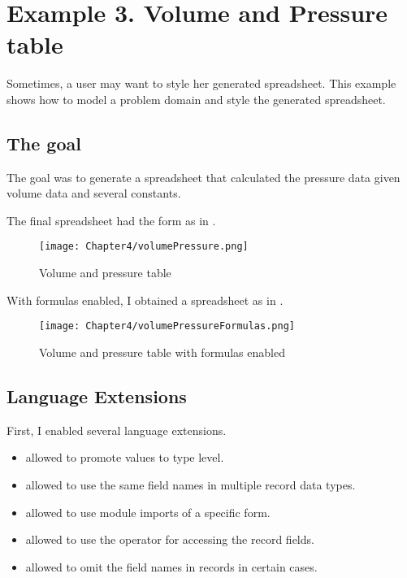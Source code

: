 \section{Example 3. Volume and Pressure table}

Sometimes, a user may want to style her generated spreadsheet.
This example shows how to model a problem domain and style the generated spreadsheet.

\subsection{The goal}

The goal was to generate a spreadsheet that calculated the pressure data given volume data and several constants.

The final spreadsheet had the form as in .

\begin{figure}[h]
  \centering
  \texttt{[image: Chapter4/volumePressure.png]}
  \caption{Volume and pressure table}
  \label{fig:volumePressure}
\end{figure}

With formulas enabled, I obtained a spreadsheet as in .

\begin{figure}[h]
  \centering
  \texttt{[image: Chapter4/volumePressureFormulas.png]}
  \caption{Volume and pressure table with formulas enabled}
  \label{fig:volumePressureFormulas}
\end{figure}

\subsection{Language Extensions}

First, I enabled several language extensions.
\begin{itemize}
  \item {} allowed to promote values to type level.
  \item {} allowed to use the same field names in multiple record data types.
  \item {} allowed to use module imports of a specific form.
  \item {} allowed to use the  operator for accessing the record fields.
  \item {} allowed to omit the field names in records in certain cases.
\end{itemize}

